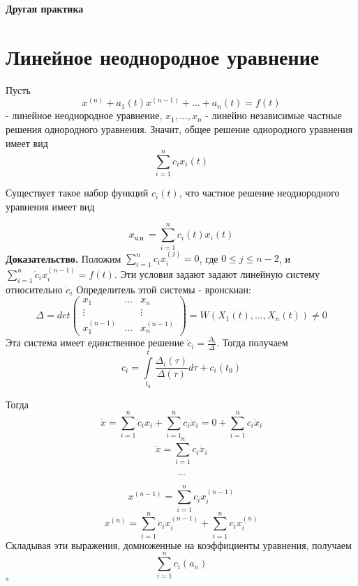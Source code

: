
\textbf{Другая практика}

\section{Линейное неоднородное уравнение}
Пусть 
\begin{equation}
    x^{(n)} + a_1(t)x^{(n-1)}+...+a_n(t) = f(t)
\end{equation}
- линейное неоднородное уравнение, $x_1,...,x_n$ - 
линейно независимые частные решения однородного уравнения. 
Значит, общее решение однородного уравнения имеет вид
$$\sum\limits_{i=1}^{n} c_ix_i(t)$$ 
\begin{theor}
Существует такое набор функций $c_i(t)$, что 
частное решение неоднородного уравнения имеет вид 
\end{theor}
$$x_\text{ч.н.} = \sum\limits_{i=1}^{n} c_i(t)x_i(t)$$
\textbf{Доказательство.}  Положим $\sum\limits_{i=1}^{n} \dot c_ix^{(j)}_i=0$,
где $0\leqslant j\leqslant  n-2$, и
$\sum\limits_{i=1}^{n} \dot c_i x^{(n-1)}_i = f(t)$. 
Эти условия задают задают линейную систему относительно $\dot c_i$ Определитель
этой системы - вронскиан:
$$\Delta = det\begin{pmatrix} x_1 & ... & x_n \\
\vdots &&\vdots \\ x^{(n-1)}_1 &...& x_n^{(n-1)} \end{pmatrix}  = 
W (X_1(t),...,X_n(t))\ne 0$$
Эта система имеет единственное решение $\dot c_i = \frac{\Delta_i}{\Delta}$.
Тогда получаем
$$c_i = 
\int\limits_{t_0}^{t}\frac{\Delta_i(\tau)}{\Delta(\tau)}d\tau + c_i(t_0)$$

Тогда $$\dot x = \sum\limits_{i=1}^{n} \dot c_ix_i +
\sum\limits_{i=1}^{n} c_i\dot x_i = 0 + \sum\limits_{i=1}^{n} c_i\dot x_i$$
$$\ddot x = \sum\limits_{i=1}^{n} c_i \ddot x_i$$

$$...$$ 

$$x^{(n-1)}=\sum\limits_{i=1}^{n} c_i x^{(n-1)}_i$$
$$x^{(n)} = \sum\limits_{i=1}^{n} \dot c_i x^{(n-1)}_i + 
\sum\limits_{i=1}^{n} c_i x^{(n)}_i$$
Складывая эти выражения, домноженные на коэффициенты уравнения, получаем
$$\sum\limits_{i=1}^{n} c_i (a_n)$$
$\square$ 


